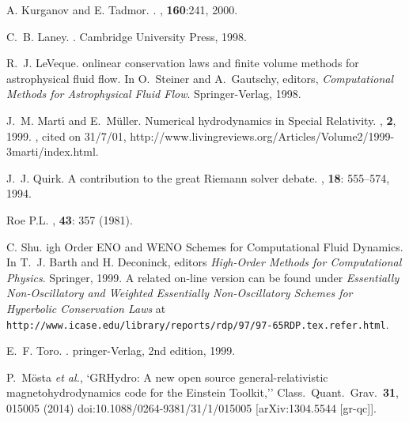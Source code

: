 \documentclass{article}
\begin{document}
\begin{thebibliography}{20}
A. Kurganov and E. Tadmor.
.
, {\bf 160}:241, 2000.

C.~B. Laney.
.
\newblock Cambridge University Press, 1998.

R.~J. LeVeque.
onlinear conservation laws and finite volume methods for
  astrophysical fluid flow.
\newblock In O.~Steiner and A.~Gautschy, editors, {\em {C}omputational
  {M}ethods for {A}strophysical {F}luid {F}low}. Springer-Verlag, 1998.

J.~M. Mart{\'{\i}} and E.~M{\"u}ller.
\newblock Numerical hydrodynamics in {S}pecial {R}elativity.
, {\bf 2}, 1999.
, cited on 31/7/01,
  http://www.livingreviews.org/Articles/Volume2/1999-3marti/index.html.

J.~J. Quirk.
\newblock A contribution to the great {R}iemann solver debate.
, {\bf 18}: 555--574,
  1994.

Roe P.L.
, {\bf 43}: 357 (1981).

C. Shu.
igh {O}rder {ENO} and {WENO} {S}chemes for
{C}omputational {F}luid {D}ynamics.
\newblock In T.~J. Barth and H. Deconinck, editors {\em High-Order
  Methods for Computational Physics}. Springer, 1999.
\newblock A related on-line version can be found under {\em Essentially
  {N}on-{O}scillatory and {W}eighted {E}ssentially {N}on-{O}scillatory
  {S}chemes for {H}yperbolic {C}onservation {L}aws} at {\tt
  http://www.icase.edu/library/reports/rdp/97/97-65RDP.tex.refer.html}. 

E.~F. Toro.
.
pringer-{V}erlag, 2nd edition, 1999.

  P.~Mösta {\it et al.},
  `GRHydro: A new open source general-relativistic magnetohydrodynamics code for the Einstein Toolkit,''
  Class.\ Quant.\ Grav.\  {\bf 31}, 015005 (2014)
  doi:10.1088/0264-9381/31/1/015005
  [arXiv:1304.5544 [gr-qc]].

\end{thebibliography}
\end{document}
